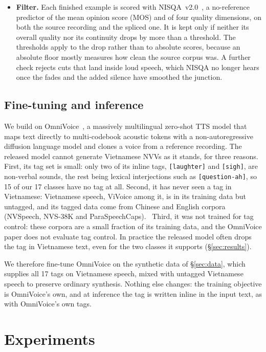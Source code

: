 \documentclass{article} %
\begin{document}
\begin{itemize}
\item \textbf{Filter.} Each finished example is scored with NISQA~v2.0~\citep{nisqa}, a
no-reference predictor of the mean opinion score (MOS) and of four quality dimensions, on both
the source recording and the spliced one. It is kept only if neither its overall quality nor
its continuity drops by more than a threshold. The thresholds apply to the drop rather than to
absolute scores, because an absolute floor mostly measures how clean the source corpus was. A
further check rejects cuts that land inside loud speech, which NISQA no longer hears once the
fades and the added silence have smoothed the junction.
\end{itemize}

\subsection{Fine-tuning and inference}\label{sec:adapt}
We build on OmniVoice~\citep{omnivoice}, a massively multilingual zero-shot TTS model that maps
text directly to multi-codebook acoustic tokens with a non-autoregressive diffusion language
model and clones a voice from a reference recording. The released model cannot generate
Vietnamese NVVs as it stands, for three reasons. First, its tag set is small: only two of its
inline tags, \texttt{[laughter]} and \texttt{[sigh]}, are non-verbal sounds, the rest being
lexical interjections such as \texttt{[question-ah]}, so 15 of our 17 classes have no tag at
all. Second, it has never seen a tag in Vietnamese: Vietnamese speech, ViVoice among it, is in
its training data but untagged, and its tagged data come from Chinese and English corpora
(NVSpeech, NVS-38K and ParaSpeechCaps).%
\ Third, it was not trained for tag control: these corpora are a small fraction of its training
data, and the OmniVoice paper does not evaluate tag control. In practice the released model
often drops the tag in Vietnamese text, even for the two classes it supports
(\S\ref{sec:results}).

We therefore fine-tune OmniVoice on the synthetic data of \S\ref{sec:data}, which supplies all
17 tags on Vietnamese speech, mixed with untagged Vietnamese speech to preserve ordinary
synthesis. Nothing else changes: the training objective is OmniVoice's own, and at inference
the tag is written inline in the input text, as with OmniVoice's own tags.

\section{Experiments}\label{sec:exp}
\end{document}
